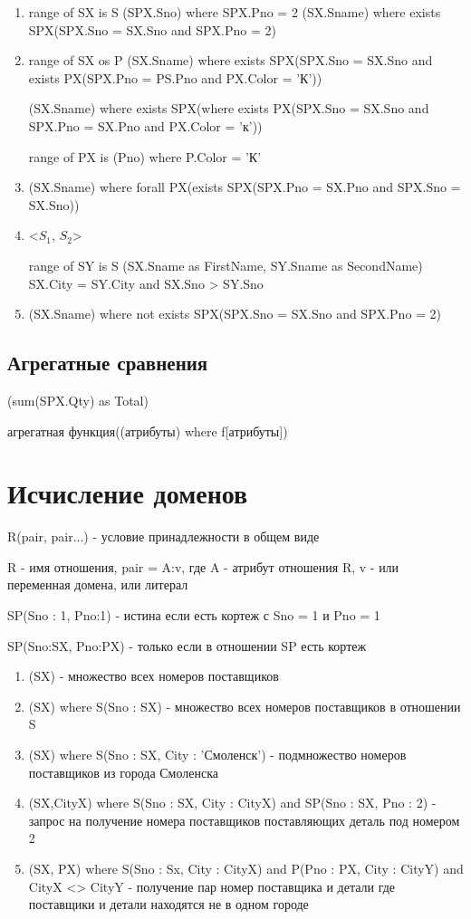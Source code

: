 \documentclass[a4paper, 14pt]{report}
\begin{document}
\begin{enumerate}
    \item range of SX is S (SPX.Sno) where SPX.Pno = 2 (SX.Sname) where exists SPX(SPX.Sno = SX.Sno and SPX.Pno = 2)
    \item range of SX os P (SX.Sname) where exists SPX(SPX.Sno = SX.Sno and exists PX(SPX.Pno = PS.Pno and PX.Color = 'К'))

        (SX.Sname) where exists SPX(where exists PX(SPX.Sno = SX.Sno and SPX.Pno = SX.Pno and PX.Color = 'к'))

        range of PX is (Pno) where P.Color = 'К'

    \item (SX.Sname) where forall PX(exists SPX(SPX.Pno = SX.Pno and SPX.Sno = SX.Sno))

    \item <$S_1$, $S_2$>

        range of SY is S (SX.Sname as FirstName, SY.Sname as SecondName) SX.City = SY.City and SX.Sno > SY.Sno

    \item (SX.Sname) where not exists SPX(SPX.Sno = SX.Sno and SPX.Pno = 2)
\end{enumerate}

\subsection{Агрегатные сравнения}

(sum(SPX.Qty) as Total)

агрегатная функция((атрибуты) where f[атрибуты])

\section{Исчисление доменов}

R(pair, pair...) - условие принадлежности в общем виде

R - имя отношения, pair = A:v, где A - атрибут отношения R, v - или переменная
домена, или литерал

SP(Sno : 1, Pno:1) - истина если есть кортеж с Sno = 1 и Pno = 1

SP(Sno:SX, Pno:PX) - только если в отношении SP есть кортеж

\begin{enumerate}
    \item (SX) - множество всех номеров поставщиков
    \item (SX) where S(Sno : SX) - множество всех номеров поставщиков в отношении S
    \item (SX) where S(Sno : SX, City : 'Смоленск') - подмножество номеров поставщиков из города Смоленска
    \item (SX,CityX) where S(Sno : SX, City : CityX) and SP(Sno : SX, Pno : 2) - запрос на получение номера поставщиков поставляющих деталь под номером 2
    \item (SX, PX) where S(Sno : Sx, City : CityX) and P(Pno : PX, City : CityY) and CityX <> CityY - получение пар номер поставщика и детали где поставщики и детали находятся не в одном городе
\end{enumerate}
\end{document}
